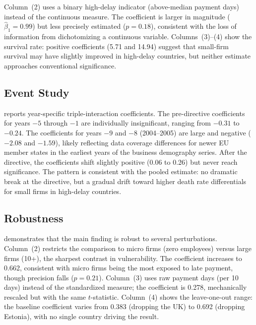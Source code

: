 \documentclass[12pt]{article}
\begin{document}
Column~(2) uses a binary high-delay indicator (above-median payment days) instead of the continuous measure. The coefficient is larger in magnitude ($\hat{\beta}_1 = 0.99$) but less precisely estimated ($p = 0.18$), consistent with the loss of information from dichotomizing a continuous variable. Columns~(3)--(4) show the survival rate: positive coefficients (5.71 and 14.94) suggest that small-firm survival may have slightly improved in high-delay countries, but neither estimate approaches conventional significance.



\subsection{Event Study}

 reports year-specific triple-interaction coefficients. The pre-directive coefficients for years $-5$ through $-1$ are individually insignificant, ranging from $-0.31$ to $-0.24$. The coefficients for years $-9$ and $-8$ (2004--2005) are large and negative ($-2.08$ and $-1.59$), likely reflecting data coverage differences for newer EU member states in the earliest years of the business demography series. After the directive, the coefficients shift slightly positive (0.06 to 0.26) but never reach significance. The pattern is consistent with the pooled estimate: no dramatic break at the directive, but a gradual drift toward higher death rate differentials for small firms in high-delay countries.



\subsection{Robustness}

 demonstrates that the main finding is robust to several perturbations. Column~(2) restricts the comparison to micro firms (zero employees) versus large firms (10+), the sharpest contrast in vulnerability. The coefficient increases to 0.662, consistent with micro firms being the most exposed to late payment, though precision falls ($p = 0.21$). Column~(3) uses raw payment days (per 10 days) instead of the standardized measure; the coefficient is 0.278, mechanically rescaled but with the same $t$-statistic. Column~(4) shows the leave-one-out range: the baseline coefficient varies from 0.383 (dropping the UK) to 0.692 (dropping Estonia), with no single country driving the result.
\end{document}
